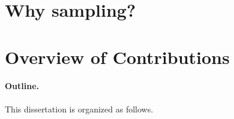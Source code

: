 %
%

\section{Why sampling?}

\section{Overview of Contributions}

\paragraph*{Outline.} This dissertation is organized as follows.


